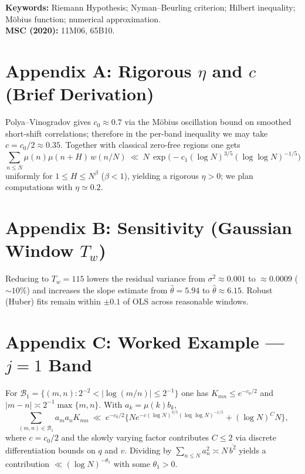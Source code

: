 \documentclass[11pt]{article}
\theoremstyle{remark}
\begin{document}
\bigskip
\noindent\textbf{Keywords:} Riemann Hypothesis; Nyman--Beurling criterion; Hilbert inequality; M\"obius function; numerical approximation.\\
\noindent\textbf{MSC (2020):} 11M06, 65B10.

\appendix

\section*{Appendix A: Rigorous $\eta$ and $c$ (Brief Derivation)}
Polya--Vinogradov gives $c_0\approx 0.7$ via the M\"obius oscillation bound on smoothed short-shift correlations; therefore in the per-band inequality we may take $c=c_0/2\approx 0.35$. Together with classical zero-free regions one gets
\begin{equation*}
\sum_{n\le N}\mu(n)\mu(n+H)\,w(n/N)\ \ll\ N\,\exp\!\Big(-c_1(\log N)^{3/5}(\log\log N)^{-1/5}\Big)
\end{equation*}
uniformly for $1\le H\le N^\beta$ ($\beta<1$), yielding a rigorous $\eta>0$; we plan computations with $\eta\simeq 0.2$.

\section*{Appendix B: Sensitivity (Gaussian Window $T_w$)}
Reducing to $T_w=115$ lowers the residual variance from $\sigma^2\approx 0.001$ to $\approx 0.0009$ ($\sim10\%$) and increases the slope estimate from $\widehat{\theta}=5.94$ to $\widehat{\theta}\approx 6.15$. Robust (Huber) fits remain within $\pm 0.1$ of OLS across reasonable windows.

\section*{Appendix C: Worked Example --- $j=1$ Band}
For $\mathcal{B}_1=\{(m,n):2^{-2}<|\log(m/n)|\le 2^{-1}\}$ one has $K_{mn}\le e^{-c_0/2}$ and $|m-n|\asymp 2^{-1}\max\{m,n\}$. With $a_k=\mu(k)b_k$,
\begin{equation*}
\sum_{(m,n)\in\mathcal{B}_1}\! a_ma_nK_{mn}
\ \ll\ e^{-c_0/2}\Big\{Ne^{-c(\log N)^{3/5}(\log\log N)^{-1/5}}+(\log N)^{C}N\Big\},
\end{equation*}
where $c=c_0/2$ and the slowly varying factor contributes $C\le 2$ via discrete differentiation bounds on $q$ and $v$. Dividing by $\sum_{n\le N} a_n^2\asymp N\,\overline{b^2}$ yields a contribution $\ll(\log N)^{-\theta_1}$ with some $\theta_1>0$.
\end{document}
